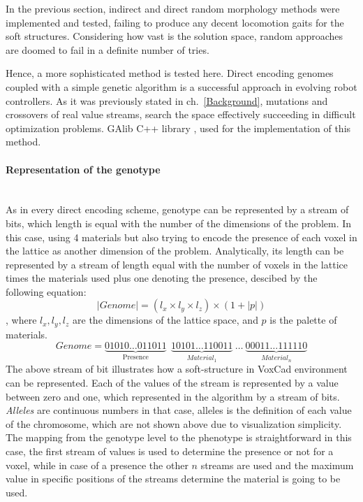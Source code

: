 In the previous section, indirect and direct random morphology methods were implemented and tested, failing to produce any decent locomotion gaits for the soft structures. Considering how vast is the solution space, random approaches are doomed to fail in a definite number of tries. 

Hence, a more sophisticated method is tested here. Direct encoding genomes coupled with a simple genetic algorithm is a successful approach in evolving robot controllers. As it was previously stated in ch.~\ref{Background}, mutations and crossovers of real value streams, search the space effectively succeeding in difficult optimization problems. GAlib C++ library \cite{wall1996galib}, used for the implementation of this method.

\paragraph{Representation of the genotype}~\\
As in every direct encoding scheme, genotype can be represented by a stream of bits, which length is equal with the number of the dimensions of the problem. In this case, using 4 materials but also trying to encode the presence of each voxel in the lattice as another dimension of the problem. Analytically, its length can be represented by a stream of length equal with the number of voxels in the lattice times the materials used plus one denoting the presence, descibed by the following equation:
\begin{equation}
\label{lengthDirect}
| Genome | = (l_x \times l_y \times l_z ) \times (1 + |p|)
\end{equation}
, where $l_x, l_y, l_z$ are the dimensions of the lattice space, and $p$ is the palette of materials.
\begin{equation*}
Genome = \underbrace{01010\ldots011011}_\text{Presence}\ \    \underbrace{10101\ldots110011}_{Material_1} \   \ldots\  \underbrace{00011\ldots111110}_{Material_n}
\end{equation*}
The above stream of bit illustrates how a soft-structure in VoxCad environment can be represented. Each of the values of the stream is represented by a value between zero and one, which represented 
in the algorithm by a stream of bits. \emph{Alleles} are continuous numbers in that case, alleles is the definition of each value of the chromosome, which are not shown above due to visualization simplicity. The mapping from the genotype level to the phenotype is straightforward in this case, the first stream of values is used to determine the presence or not for a voxel, while in case of a presence the other $n$ streams are used and the maximum value in specific positions of the streams determine the material is going to be used.

